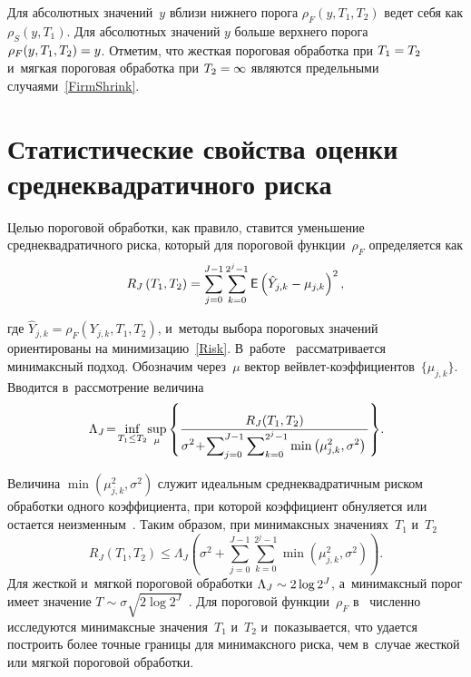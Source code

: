 \begin{multicols}{2}
\noindent
Для абсолютных значений~$y$ вблизи нижнего порога $\rho_{F}(y,T_1,T_2)$ ведет 
себя как $\rho_{S}(y,T_1)$. Для абсолютных значений $y$ больше верхнего порога 
$\rho_{F}(y,T_1,T_2)\hm=y$. Отметим, что жесткая пороговая обработка при $T_1 \hm= 
T_2$ и~мягкая пороговая обработка  при $T_2 \hm= \infty$ являются предельными 
случаями~\eqref{FirmShrink}.


\section{Статистические свойства оценки среднеквадратичного риска}

Целью пороговой обработки, как правило, ставится уменьшение среднеквадратичного 
риска, который для пороговой функции~$\rho_{F}$ определяется как
\begin{equation}
\label{Risk}
R_J\left(T_1,T_2\right)=\sum\limits_{j=0}^{J-1}\sum\limits_{k=0}^{2^j-1}{\sf E}\left(\hat{Y}_{j,k}-
\mu_{j,k}\right)^2,
\end{equation}

\vspace*{-2pt}

\noindent
где $\hat{Y}_{j,k}=\rho_{F}(Y_{j,k},T_1,T_2)$, и~методы выбора пороговых 
значений ориентированы на минимизацию~\eqref{Risk}. В~работе~\cite{BG97} 
рассматривается минимаксный подход. Обозначим через~$\mu$ вектор вейв\-лет-ко\-эф\-фи\-ци\-ен\-тов~$\{\mu_{j,k}\}$. 
Вводится в~рассмотрение величина
$$
\Lambda_J\!=\!\inf\limits_{T_1\leq T_2}\!\sup\limits_{\mu}\left\{\displaystyle\frac{\displaystyle R_J(T_1,T_2)\mathstrut}{\displaystyle \sigma^2\!+\!\sum\nolimits_{j=0}^{J-1}\sum\nolimits_{k=0}^{2^j-1}
\min\left(\mu_{j,k}^2,\sigma^2\right)\mathstrut}
\right\}\!.\hspace*{-1.2534pt}
$$

\noindent
Величина $\min(\mu_{j,k}^2,\sigma^2)$ служит идеальным среднеквадратичным риском 
обработки одного коэффициента, при которой коэффициент обнуляется или остается 
неизменным~\cite{DonJ94}. Таким образом, при минимаксных значениях~$T_1$ и~$T_2$
\begin{equation*}
R_J\left(T_1,T_2\right)\leq\Lambda_J\left(\sigma^2+\sum\limits_{j=0}^{J-1}\sum\limits_{k=0}^{2^j-1}\min\left(\mu_{j,k}^2,\sigma^2\right)\right).
\end{equation*}
Для жесткой и~мягкой пороговой обработки $\Lambda_J\hm\sim 2\log 2^J$, а~минимаксный 
порог имеет значение $T\sim\sigma\sqrt{2 \log 2^J}$~\cite{DonJ98}. Для пороговой 
функции~$\rho_{F}$ в~\cite{BG97} численно исследуются минимаксные значения~$T_1$ и~$T_2$ 
и~показывается, что удается построить более точные границы для 
минимаксного риска, чем в~случае жесткой или мягкой пороговой обработки.


\end{multicols}
